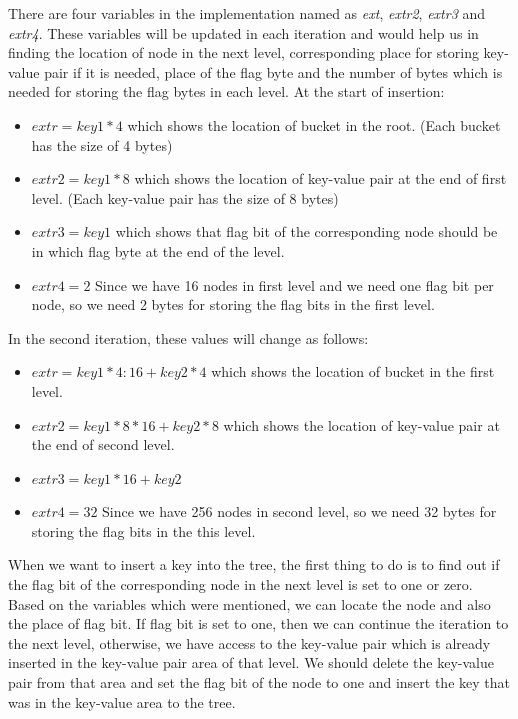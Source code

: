\documentclass{report}
\begin{document}
There are four variables in the implementation named as \textit{ext}, \textit{extr2}, \textit{extr3} and \textit{extr4}. These variables will be updated in each iteration and would help us in finding the location of node in the next level, corresponding place for storing key-value pair if it is needed, place of the flag byte and the number of bytes which is needed for storing the flag bytes in each level. At the start of insertion:

\begin{itemize}
\item $extr=key1*4$ which shows the location of bucket in the root. (Each bucket has the size of 4 bytes)
\item $extr2=key1*8$ which shows the location of key-value pair at the end of first level. (Each key-value pair has the size of 8 bytes) 
\item $extr3=key1$ which shows that flag bit of the corresponding node should be in which flag byte at the end of the level.
\item $extr4=2$ Since we have 16 nodes in first level and we need one flag bit per node, so we need 2 bytes for storing the flag bits in the first level.
\end{itemize} 

In the second iteration, these values will change as follows:

\begin{itemize}
\item $extr=key1*4:16+key2*4$ which shows the location of bucket in the first level. 
\item $extr2=key1*8*16+key2*8$ which shows the location of key-value pair at the end of second level. 
\item $extr3=key1*16+key2$
\item $extr4=32$ Since we have 256 nodes in second level, so we need 32 bytes for storing the flag bits in the this level.
\end{itemize}

When we want to insert a key into the tree, the first thing to do is to find out if the flag bit of the corresponding node in the next level is set to one or zero. Based on the variables which were mentioned, we can locate the node and also the place of flag bit. If flag bit is set to one, then we can continue the iteration to the next level, otherwise, we have access to the key-value pair which is already inserted in the key-value pair area of that level. We should delete the key-value pair from that area and set the flag bit of the node to one and insert the key that was in the key-value area to the tree.
\end{document}

